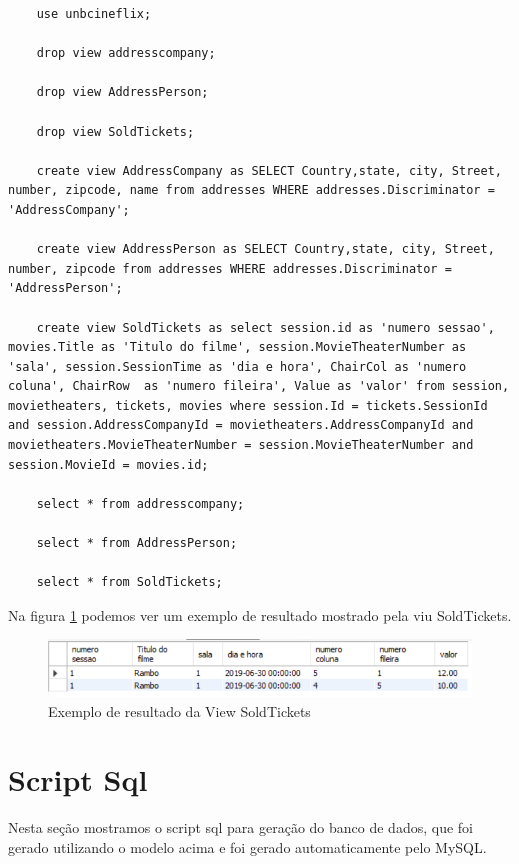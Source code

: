 \documentclass[a4paper,10pt]{article}
\begin{document}
\begin{lstlisting}
	use unbcineflix;

	drop view addresscompany;

	drop view AddressPerson;

	drop view SoldTickets;

	create view AddressCompany as SELECT Country,state, city, Street, number, zipcode, name from addresses WHERE addresses.Discriminator = 'AddressCompany';

	create view AddressPerson as SELECT Country,state, city, Street, number, zipcode from addresses WHERE addresses.Discriminator = 'AddressPerson';

	create view SoldTickets as select session.id as 'numero sessao', movies.Title as 'Titulo do filme', session.MovieTheaterNumber as 'sala', session.SessionTime as 'dia e hora', ChairCol as 'numero coluna', ChairRow  as 'numero fileira', Value as 'valor' from session, movietheaters, tickets, movies where session.Id = tickets.SessionId and session.AddressCompanyId = movietheaters.AddressCompanyId and movietheaters.MovieTheaterNumber = session.MovieTheaterNumber and session.MovieId = movies.id;

	select * from addresscompany;

	select * from AddressPerson;

	select * from SoldTickets;
\end{lstlisting}

Na figura \ref{fig:view_soldticket} podemos ver um exemplo de resultado mostrado pela viu SoldTickets.

\begin{figure}%
\includegraphics[width=\columnwidth]{View_exemplo}%
\caption{Exemplo de resultado da View SoldTickets}%
\label{fig:view_soldticket}%
\end{figure}

\section{Script Sql}

Nesta seção mostramos o script sql para geração do banco de dados, que foi gerado utilizando o modelo acima e foi gerado automaticamente pelo MySQL.
\end{document}
